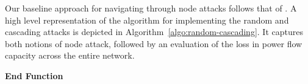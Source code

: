 Our baseline approach for navigating through node attacks follows that of \cite{2000Natur.406..378A}. A high level representation of the algorithm for implementing the random and cascading attacks is depicted in Algorithm~\ref{algo:random-cascading}. It captures both notions of node attack, followed by an evaluation of the loss in power flow capacity across the entire network.
%
\begin{algorithm}[ht]
\textbf{End Function}
 \caption{}
 \label{algo:random-cascading}
\end{algorithm}

